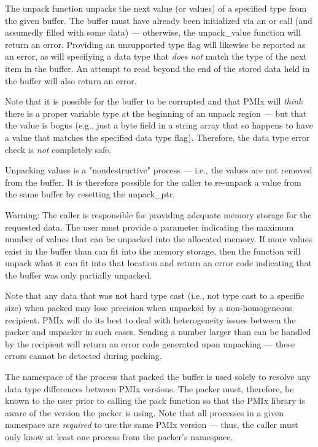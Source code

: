\descr

The unpack function unpacks the next value (or values) of a specified type from the given buffer. The buffer must have already been initialized via an  or  call (and assumedly filled with some data) --- otherwise, the unpack_value function will return an error. Providing an unsupported type flag will likewise be reported as an error, as will specifying a data type that \textit{does not} match the type of the next item in the buffer. An attempt to read beyond the end of the stored data held in the buffer will also return an error.

Note that it is possible for the buffer to be corrupted and that \ac{PMIx} will \textit{think} there is a proper variable type at the beginning of an unpack region --- but that the value is bogus (e.g., just a byte field in a string array that so happens to have a value that matches the specified data type flag). Therefore, the data type error check is \textit{not} completely safe.

Unpacking values is a "nondestructive" process --- i.e., the values are not removed from the buffer. It is therefore possible for the caller to re-unpack a value from the same buffer by resetting the unpack_ptr.

Warning: The caller is responsible for providing adequate memory storage for the requested data. The user must provide a parameter indicating the maximum number of values that can be unpacked into the allocated memory. If more values exist in the buffer than can fit into the memory storage, then the function will unpack what it can fit into that location and return an error code indicating that the buffer was only partially unpacked.

Note that any data that was not hard type cast (i.e., not type cast to a specific size) when packed may lose precision when unpacked by a non-homogeneous recipient. \ac{PMIx} will do its best to deal with heterogeneity issues between the packer and unpacker in such cases. Sending a number larger than can be handled by the recipient will return an error code generated upon unpacking --- these errors cannot be detected during packing.

The namespace of the process that packed the buffer is used solely to resolve any data type
differences between \ac{PMIx} versions. The packer must, therefore, be
known to the user prior to calling the pack function so that the
\ac{PMIx} library is aware of the version the packer is using. Note that
all processes in a given namespace are \textit{required} to use the same \ac{PMIx}
version --- thus, the caller must only know at least one process from the
packer's namespace.


